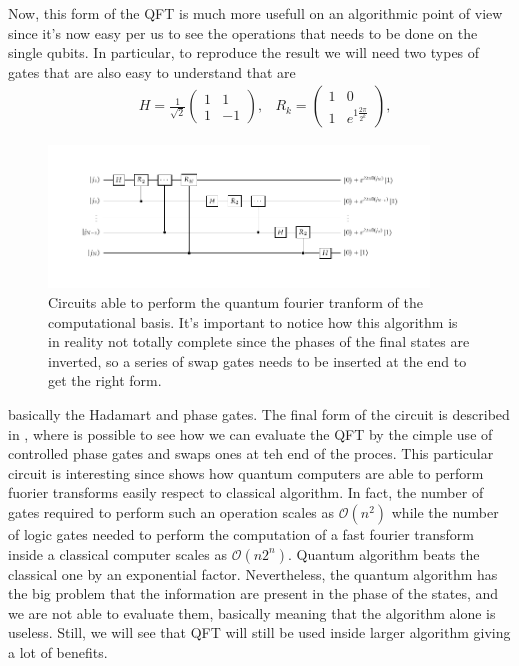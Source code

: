 Now, this form of the QFT is much more usefull on an algorithmic point of view since it's now easy per us to see the operations that needs to be done on the single qubits. In particular, to reproduce the result we will need two types of gates that are also easy to understand that are
\begin{align}
    &H = \frac{1}{\sqrt{2}}\begin{pmatrix}
        1 & 1\\
        1 & -1
    \end{pmatrix},
    &R_k = \begin{pmatrix}
        1 & 0\\
        1 & e^{1\frac{2\pi}{2^k}}
    \end{pmatrix},
\end{align}
\begin{figure}[t]
    \centering
    \includegraphics[width=0.9\textwidth]{Immagini/QFT.pdf}
    \caption
    {
        Circuits able to perform the quantum fourier tranform of the computational basis. It's important to notice how this algorithm is in reality not totally complete since the phases of the final states are inverted, so a series of swap gates needs to be inserted at the end to get the right form.
    }
    \label{fig:QFT}
\end{figure}
basically the Hadamart and phase gates. The final form of the circuit is described in , where is possible to see how we can evaluate the QFT by the cimple use of controlled phase gates and swaps ones at teh end of the proces. This particular circuit is interesting since shows how quantum computers are able to perform fuorier transforms easily respect to classical algorithm. In fact, the number of gates required to perform such an operation scales as $\mathcal{O}(n^2)$ while the number of logic gates needed to perform the computation of a fast fourier transform inside a classical computer scales as $\mathcal{O}(n2^n)$. Quantum algorithm beats the classical one by an exponential factor. Nevertheless, the quantum algorithm has the big problem that the information are present in the phase of the states, and we are not able to evaluate them, basically meaning that the algorithm alone is useless. Still, we will see that QFT will still be used inside larger algorithm giving a lot of benefits.